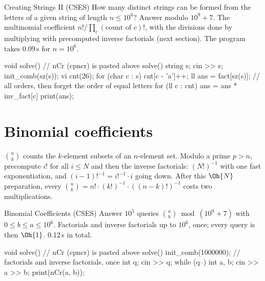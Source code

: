 \begin{problem}{Creating Strings II (CSES)}
How many distinct strings can be formed from the letters of a given string of length $n \le 10^6$? Answer modulo $10^9 + 7$.
\solution The multinomial coefficient $n! / \prod_c (\text{count of } c)!$, with the divisions done by multiplying with precomputed
inverse factorials (next section). The program takes 0.09\,s for $n = 10^6$.
\end{problem}

\begin{code}
void solve() {  // nCr (cpncr) is pasted above solve()
    string s;
    cin >> s;
    init_comb(sz(s));
    vi cnt(26);
    for (char c : s) cnt[c - 'a']++;
    ll ans = fact[sz(s)];  // all orders, then forget the order of equal letters
    for (ll c : cnt) ans = ans * inv_fact[c] %
    print(ans);
}
\end{code}

\section[Binomial coefficients]{Binomial coefficients \hfill \gold}\label{sec:binomial}

$\binom{n}{k}$ counts the $k$-element subsets of an $n$-element set. Modulo a prime $p > n$, precompute $i!$ for all $i \le N$ and then
the inverse factorials: $(N!)^{-1}$ with one fast exponentiation, and $(i - 1)!^{-1} = i!^{-1} \cdot i$ going down. After this $\Oh{N}$
preparation, every $\binom{n}{k} = n! \cdot (k!)^{-1} \cdot ((n-k)!)^{-1}$ costs two multiplications.


\begin{problem}{Binomial Coefficients (CSES)}
Answer $10^5$ queries $\binom{a}{b} \bmod (10^9 + 7)$ with $0 \le b \le a \le 10^6$.
\solution Factorials and inverse factorials up to $10^6$, once; every query is then $\Oh{1}$. 0.12\,s in total.
\end{problem}

\begin{code}
void solve() {  // nCr (cpncr) is pasted above solve()
    init_comb(1000000);  // factorials and inverse factorials, once
    int q;
    cin >> q;
    while (q--) {
        int a, b;
        cin >> a >> b;
        print(nCr(a, b));
    }
}
\end{code}

